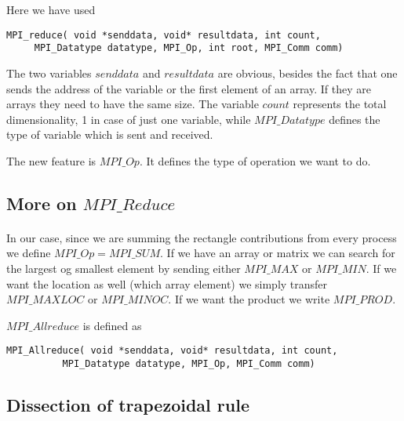 \documentclass[%
oneside,                 %
final,                   %
10pt]{article}
\begin{document}
Here we have used
\begin{verbatim}
MPI_reduce( void *senddata, void* resultdata, int count, 
     MPI_Datatype datatype, MPI_Op, int root, MPI_Comm comm)
\end{verbatim}

The two variables $senddata$ and $resultdata$ are obvious, besides the fact that one sends the address
of the variable or the first element of an array.  If they are arrays they need to have the same size. 
The variable $count$ represents the total dimensionality, 1 in case of just one variable, 
while $MPI\_Datatype$ 
defines the type of variable which is sent and received.  

The new feature is $MPI\_Op$. It defines the type
of operation we want to do.



\subsection*{More on $MPI\_Reduce$}

\paragraph{}
In our case, since we are summing
the rectangle  contributions from every process we define  $MPI\_Op = MPI\_SUM$.
If we have an array or matrix we can search for the largest og smallest element by sending either $MPI\_MAX$ or 
$MPI\_MIN$.  If we want the location as well (which array element) we simply transfer 
$MPI\_MAXLOC$ or $MPI\_MINOC$. If we want the product we write $MPI\_PROD$. 

$MPI\_Allreduce$ is defined as
\begin{verbatim}
MPI_Allreduce( void *senddata, void* resultdata, int count, 
          MPI_Datatype datatype, MPI_Op, MPI_Comm comm)        
\end{verbatim}



\subsection*{Dissection of trapezoidal rule}
\end{document}

